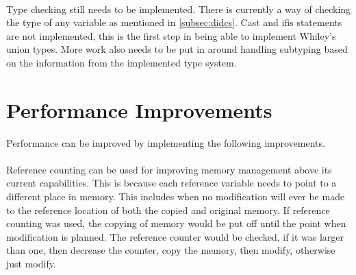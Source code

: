 \paragraph{}
Type checking still needs to be implemented. There is currently a way of checking the type of any variable as mentioned in \ref{subsec:didcs}. Cast and ifis statements are not implemented, this is the first step in being able to implement Whiley's union types. More work also needs to be put in around handling subtyping based on the information from the implemented type system.

\section{Performance Improvements}

Performance can be improved by implementing the following improvements.

\paragraph{}
Reference counting can be used for improving memory management above its current capabilities. This is because each reference variable needs to point to a different place in memory. This includes when no modification will ever be made to the reference location of both the copied and original memory. If reference counting was used, the copying of memory would be put off until the point when modification is planned. The reference counter would be checked, if it was larger than one, then decrease the counter, copy the memory, then modify, otherwise just modify.



